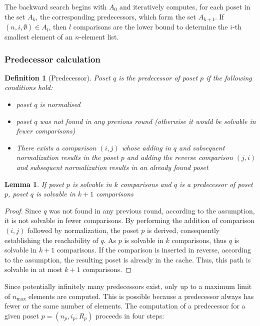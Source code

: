 \documentclass[10pt,journal,compsoc]{IEEEtran}
\newtheorem{lemma}{Lemma}
\newtheorem{definition}{Definition}
\begin{document}
The backward search begins with $A_0$ and iteratively computes, for each poset in the set $A_k$, the corresponding predecessors, which form the set $A_{k + 1}$.
If $(n, i, \emptyset) \in A_l$, then $l$ comparisons are the lower bound to determine the $i$-th smallest element of an $n$-element list.


\subsubsection{Predecessor calculation} \label{sec:backward:predecessor_calculation}

\begin{definition}[Predecessor] \label{definition:predecessor_calculation}
  Poset $q$ is the predecessor of poset $p$ if the following conditions hold:
  \begin{itemize}
    \item poset $q$ is normalised
    \item poset $q$ was not found in any previous round (otherwise it would be solvable in fewer comparisons)
    \item There exists a comparison $(i, j)$ whose adding in $q$ and subsequent normalization results in the poset $p$ and adding the reverse comparison $(j, i)$ and subsequent normalization results in an already found poset
  \end{itemize}
\end{definition}

\begin{lemma} \label{lemma:predecessor_calculation}
  If poset $p$ is solvable in $k$ comparisons and $q$ is a predecessor of poset $p$, poset $q$ is solvable in $k + 1$ comparisons
\end{lemma}

\begin{proof} \label{proof:predecessor_calculation}
  Since $q$ was not found in any previous round, according to the assumption, it is not solvable in fewer comparisons.
  By performing the addition of comparison $(i, j)$ followed by normalization, the poset $p$ is derived, consequently establishing the reachability of $q$.
  As $p$ is solvable in $k$ comparisons, thus $q$ is solvable in $k + 1$ comparisons.
  If the comparison is inserted in reverse, according to the assumption, the resulting poset is already in the cache.
  Thus, this path is solvable in at most $k + 1$ comparisons.
\end{proof}

Since potentially infinitely many predecessors exist, only up to a maximum limit of $n_{\text{max}}$ elements are computed.
This is possible because a predecessor always has fewer or the same number of elements.
The computation of a predecessor for a given poset $p = (n_p, i_p, R_p)$ proceeds in four steps:
\end{document}
